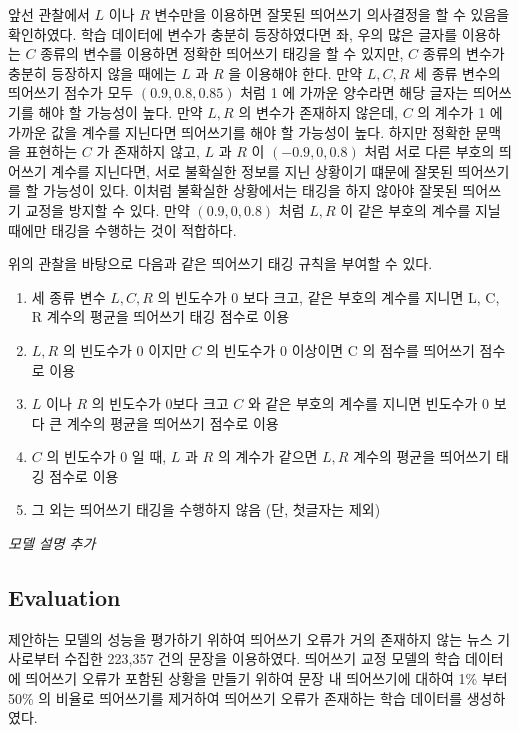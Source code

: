 \documentclass[11pt]{article}
\begin{document}
앞선 관찰에서 $L$ 이나 $R$ 변수만을 이용하면 잘못된 띄어쓰기 의사결정을 할 수 있음을 확인하였다.
학습 데이터에 변수가 충분히 등장하였다면 좌, 우의 많은 글자를 이용하는 $C$ 종류의 변수를 이용하면 정확한 띄어쓰기 태깅을 할 수 있지만, $C$ 종류의 변수가 충분히 등장하지 않을 때에는 $L$ 과 $R$ 을 이용해야 한다.
만약 $L, C, R$ 세 종류 변수의 띄어쓰기 점수가 모두 $(0.9, 0.8, 0.85)$ 처럼 1 에 가까운 양수라면 해당 글자는 띄어쓰기를 해야 할 가능성이 높다.
만약 $L, R$ 의 변수가 존재하지 않은데, $C$ 의 계수가 1 에 가까운 값을 계수를 지닌다면 띄어쓰기를 해야 할 가능성이 높다.
하지만 정확한 문맥을 표현하는 $C$ 가 존재하지 않고, $L$ 과 $R$ 이 $(-0.9, 0, 0.8)$ 처럼 서로 다른 부호의 띄어쓰기 계수를 지닌다면, 서로 불확실한 정보를 지닌 상황이기 떄문에 잘못된 띄어쓰기를 할 가능성이 있다.
이처럼 불확실한 상황에서는 태깅을 하지 않아야 잘못된 띄어쓰기 교정을 방지할 수 있다.
만약 $(0.9, 0, 0.8)$ 처럼 $L, R$ 이 같은 부호의 계수를 지닐 때에만 태깅을 수행하는 것이 적합하다.

위의 관찰을 바탕으로 다음과 같은 띄어쓰기 태깅 규칙을 부여할 수 있다.

\begin{enumerate}
  \item 세 종류 변수  $L, C, R$ 의 빈도수가 0 보다 크고, 같은 부호의 계수를 지니면 L, C, R 계수의 평균을 띄어쓰기 태깅 점수로 이용
  \item $L, R$ 의 빈도수가 0 이지만 $C$ 의 빈도수가 0 이상이면 C 의 점수를 띄어쓰기 점수로 이용
  \item $L$ 이나  $R$ 의 빈도수가 0보다 크고 $C$ 와 같은 부호의 계수를 지니면 빈도수가 0 보다 큰 계수의 평균을 띄어쓰기 점수로 이용
  \item $C$ 의 빈도수가 0 일 때, $L$ 과 $R$ 의 계수가 같으면 $L, R$ 계수의 평균을 띄어쓰기 태깅 점수로 이용
  \item 그 외는 띄어쓰기 태깅을 수행하지 않음 (단, 첫글자는 제외)
\end{enumerate}




\textit{모델 설명 추가}




\subsection{Evaluation}

제안하는 모델의 성능을 평가하기 위하여 띄어쓰기 오류가 거의 존재하지 않는 뉴스 기사로부터 수집한 223,357 건의 문장을 이용하였다.
띄어쓰기 교정 모델의 학습 데이터에 띄어쓰기 오류가 포함된 상황을 만들기 위하여 문장 내 띄어쓰기에 대하여 1\% 부터 50\% 의 비율로 띄어쓰기를 제거하여 띄어쓰기 오류가 존재하는 학습 데이터를 생성하였다.
\end{document}
